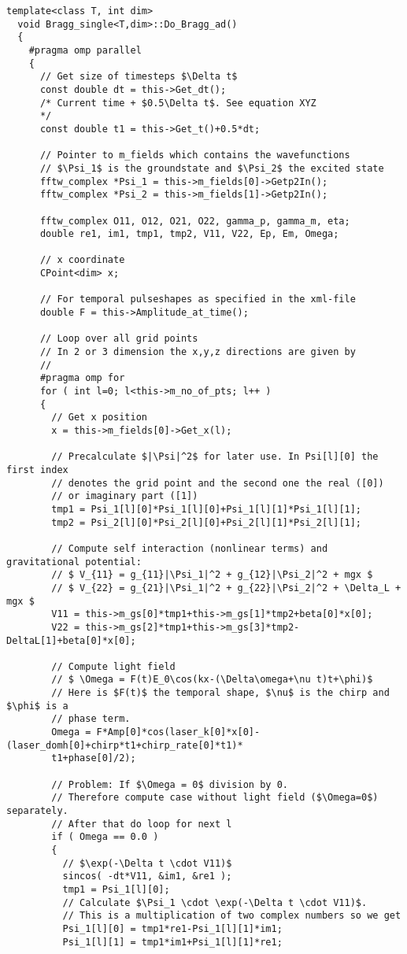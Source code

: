 \documentclass[12pt]{article}
\begin{document}
\begin{verbatim}
template<class T, int dim>
  void Bragg_single<T,dim>::Do_Bragg_ad()
  {
    #pragma omp parallel
    {
      // Get size of timesteps $\Delta t$
      const double dt = this->Get_dt();
      /* Current time + $0.5\Delta t$. See equation XYZ 
      */
      const double t1 = this->Get_t()+0.5*dt;

      // Pointer to m_fields which contains the wavefunctions
      // $\Psi_1$ is the groundstate and $\Psi_2$ the excited state
      fftw_complex *Psi_1 = this->m_fields[0]->Getp2In();
      fftw_complex *Psi_2 = this->m_fields[1]->Getp2In();

      fftw_complex O11, O12, O21, O22, gamma_p, gamma_m, eta;
      double re1, im1, tmp1, tmp2, V11, V22, Ep, Em, Omega;

      // x coordinate
      CPoint<dim> x;

      // For temporal pulseshapes as specified in the xml-file
      double F = this->Amplitude_at_time();

      // Loop over all grid points
      // In 2 or 3 dimension the x,y,z directions are given by
      // 
      #pragma omp for
      for ( int l=0; l<this->m_no_of_pts; l++ )
      {
        // Get x position
        x = this->m_fields[0]->Get_x(l);

        // Precalculate $|\Psi|^2$ for later use. In Psi[l][0] the first index
        // denotes the grid point and the second one the real ([0]) 
        // or imaginary part ([1])
        tmp1 = Psi_1[l][0]*Psi_1[l][0]+Psi_1[l][1]*Psi_1[l][1];
        tmp2 = Psi_2[l][0]*Psi_2[l][0]+Psi_2[l][1]*Psi_2[l][1];

        // Compute self interaction (nonlinear terms) and gravitational potential:
        // $ V_{11} = g_{11}|\Psi_1|^2 + g_{12}|\Psi_2|^2 + mgx $ 
        // $ V_{22} = g_{21}|\Psi_1|^2 + g_{22}|\Psi_2|^2 + \Delta_L + mgx $
        V11 = this->m_gs[0]*tmp1+this->m_gs[1]*tmp2+beta[0]*x[0];
        V22 = this->m_gs[2]*tmp1+this->m_gs[3]*tmp2-DeltaL[1]+beta[0]*x[0];

        // Compute light field
        // $ \Omega = F(t)E_0\cos(kx-(\Delta\omega+\nu t)t+\phi)$
        // Here is $F(t)$ the temporal shape, $\nu$ is the chirp and $\phi$ is a 
        // phase term.
        Omega = F*Amp[0]*cos(laser_k[0]*x[0]-(laser_domh[0]+chirp*t1+chirp_rate[0]*t1)*
        t1+phase[0]/2);

        // Problem: If $\Omega = 0$ division by 0.
        // Therefore compute case without light field ($\Omega=0$) separately.
        // After that do loop for next l
        if ( Omega == 0.0 )
        {
          // $\exp(-\Delta t \cdot V11)$
          sincos( -dt*V11, &im1, &re1 );
          tmp1 = Psi_1[l][0];
          // Calculate $\Psi_1 \cdot \exp(-\Delta t \cdot V11)$. 
          // This is a multiplication of two complex numbers so we get
          Psi_1[l][0] = tmp1*re1-Psi_1[l][1]*im1;
          Psi_1[l][1] = tmp1*im1+Psi_1[l][1]*re1;


\end{verbatim}
\end{document}
